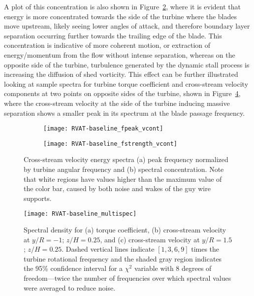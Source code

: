 A plot of this concentration is also shown in
Figure~\ref{fig:RVAT-baseline-fstrength}, where it is evident that energy is
more concentrated towards the side of the turbine where the blades move
upstream, likely seeing lower angles of attack, and therefore boundary layer
separation occurring further towards the trailing edge of the blade. This
concentration is indicative of more coherent motion, or extraction of
energy/momentum from the flow without intense separation, whereas on the
opposite side of the turbine, turbulence generated by the dynamic stall process
is increasing the diffusion of shed vorticity. This effect can be further
illustrated looking at sample spectra for turbine torque coefficient and
cross-stream velocity components at two points on opposite sides of the turbine,
shown in Figure~\ref{fig:RVAT-baseline-multispec}, where the cross-stream
velocity at the side of the turbine inducing massive separation shows a smaller
peak in its spectrum at the blade passage frequency.

\begin{figure}
    \centering
    
    \begin{subfigure}{\textwidth}
        \centering
        \texttt{[image: RVAT-baseline\_fpeak\_vcont]}
        \caption{}
        \label{fig:RVAT-baseline-fpeak}
    \end{subfigure}
    
    \begin{subfigure}{\textwidth}
        \centering
        \texttt{[image: RVAT-baseline\_fstrength\_vcont]}
        \caption{}
        \label{fig:RVAT-baseline-fstrength}
    \end{subfigure}

    \caption{Cross-stream velocity energy spectra (a) peak frequency normalized by
        turbine angular frequency and (b) spectral concentration. Note
        that white regions have values higher than the maximum value of the color
        bar, caused by both noise and wakes of the guy wire supports.}
    
    \label{fig:RVAT-baseline-fcont}
\end{figure}

\begin{figure}
    \centering

    \texttt{[image: RVAT-baseline\_multispec]}

    \caption{Spectral density for (a) torque coefficient, (b) cross-stream
        velocity at $y/R = -1$; $z/H = 0.25$, and (c) cross-stream velocity at $y/R
        = 1.5$; $z/H = 0.25$. Dashed vertical lines indicate $[1, 3, 6, 9]$ times
        the turbine rotational frequency and the shaded gray region indicates the
        95\% confidence interval for a $\chi^2$ variable with 8 degrees of
        freedom---twice the number of frequencies over which spectral values were
        averaged to reduce noise.}
    
    \label{fig:RVAT-baseline-multispec}
\end{figure}


